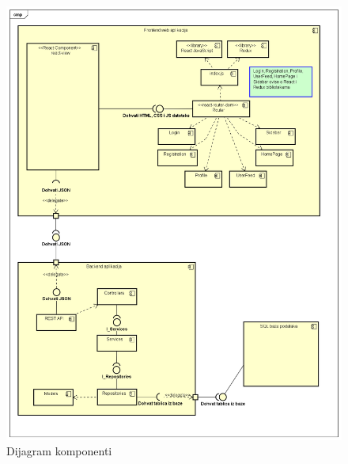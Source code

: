 	\begin{figure}[H]
		\includegraphics[scale= 0.45]{slike/Component Diagram0.png}
		\centering
		\caption{Dijagram komponenti}
		\label{fig:Dijagram komponenti}
	\end{figure} 